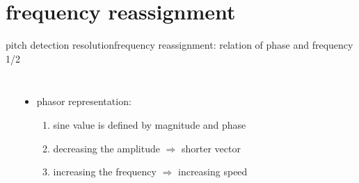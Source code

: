     \section{frequency reassignment}
        \begin{frame}{pitch detection resolution}{frequency reassignment: relation of phase and frequency 1/2}
            \begin{columns}
            \vspace{-10mm}
            \begin{center}
            \end{center}
           \begin{itemize}
                \item   phasor representation:
                    \begin{enumerate}
                        \item   sine value is defined by magnitude and phase
                        \item   decreasing the amplitude $\Rightarrow$ shorter vector
                        \item   increasing the frequency $\Rightarrow$ increasing speed
                    \end{enumerate}
            \end{itemize}
            \end{columns}

        \end{frame}
